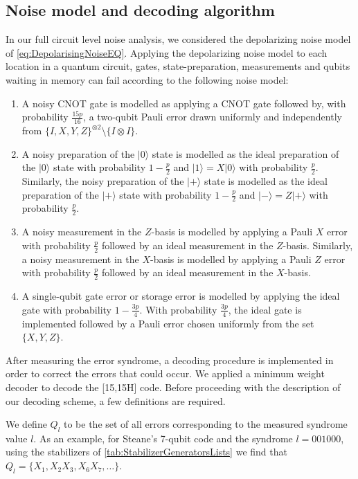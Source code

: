 \documentclass[pra,longbibliography,twocolumn,showpacs,nofootinbib,superscriptaddress,notitlepage]{revtex4-1}
\newcommand{\ket}[1]{|#1\rangle}  %
\begin{document}
\subsection{Noise model and decoding algorithm}
\label{subsec:NoiseAndDecoding}

In our full circuit level noise analysis, we considered the depolarizing noise model of \cref{eq:DepolarisingNoiseEQ}. Applying the depolarizing noise model to each location in a quantum circuit, gates, state-preparation, measurements and qubits waiting in memory can fail according to the following noise model:

\begin{enumerate}
   \item A noisy CNOT gate is modelled as applying a CNOT gate followed by, with probability $\frac{15p}{16}$, a two-qubit Pauli error drawn uniformly and independently from $\{I,X,Y,Z\}^{\otimes 2}\setminus \{I\otimes I\}$. 
   \item A noisy preparation of the $\ket{0}$ state is modelled as the ideal preparation of the $\ket{0}$ state with probability $1-\frac{p}{2}$ and $\ket{1}=X\ket{0}$ with probability $\frac{p}{2}$. Similarly, the noisy preparation of the $\ket{+}$ state is modelled as the ideal preparation of the $\ket{+}$ state with probability $1-\frac{p}{2}$ and $\ket{-}=Z\ket{+}$ with probability $\frac{p}{2}$.
   \item A noisy measurement in the $Z$-basis is modelled by applying a Pauli $X$ error with probability $\frac{p}{2}$ followed by an ideal measurement in the $Z$-basis. Similarly, a noisy measurement in the $X$-basis is modelled by applying a Pauli $Z$ error with probability $\frac{p}{2}$ followed by an ideal measurement in the $X$-basis.
   \item A single-qubit gate error or storage error is modelled by applying the ideal gate with probability $1-\frac{3p}{4}$. With probability $\frac{3p}{4}$, the ideal gate is implemented followed by a Pauli error chosen uniformly from the set  $\{ X,Y,Z \}$. 
\end{enumerate}

After measuring the error syndrome, a decoding procedure is implemented in order to correct the errors that could occur. We applied a minimum weight decoder to decode the [15,15H] code. Before proceeding with the description of our decoding scheme, a few definitions are required. 

We define $Q_{l}$ to be the set of all errors corresponding to the measured syndrome value $l$. As an example, for Steane's 7-qubit code and the syndrome $l = 001000$, using the stabilizers of \cref{tab:StabilizerGeneratorsLists} we find that $Q_{l} = \{ X_{1}, X_{2}X_{3}, X_{6}X_{7} ,\dots \}$.
\end{document}
